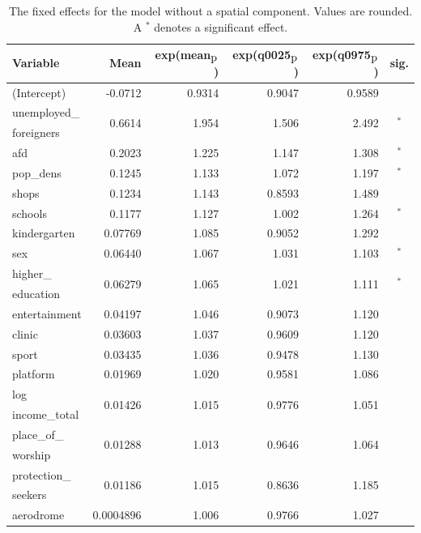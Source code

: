 \begin{table}[H] 
\caption{The fixed effects for the model without a spatial component. Values are rounded. A $^*$ denotes a significant effect.\label{fixedAllGermany}}
\begin{tabular}{l r r r r c}
\toprule
\textbf{Variable}	& \textbf{Mean}	& \textbf{exp(mean$_{\hbox{p}}$)} & \textbf{exp(q0025$_{\hbox{p}}$)} & \textbf{exp(q0975$_{\hbox{p}}$)} & \textbf{sig.}\\
\midrule
(Intercept) & -0.0712 & 0.9314 & 0.9047 & 0.9589 \\
unemployed\_ & \multirow{2}{*}{0.6614} & \multirow{2}{*}{1.954} & \multirow{2}{*}{1.506} & \multirow{2}{*}{2.492} & \multirow{2}{*}{$^*$}\\
foreigners \\
afd & 0.2023  & 1.225 & 1.147 & 1.308 & $^*$\\
pop\_dens & 0.1245 & 1.133 & 1.072 & 1.197 & $^*$\\
shops & 0.1234 & 1.143 & 0.8593 & 1.489 \\
schools & 0.1177 &1.127 & 1.002 & 1.264 & $^*$\\
kindergarten & 0.07769 & 1.085 & 0.9052 & 1.292 \\
sex & 0.06440 &1.067 & 1.031 & 1.103 & $^*$\\
higher\_ & \multirow{2}{*}{0.06279} & \multirow{2}{*}{1.065} & \multirow{2}{*}{1.021} & \multirow{2}{*}{1.111} & \multirow{2}{*}{$^*$} \\
education & \\
entertainment & 0.04197 & 1.046 & 0.9073 & 1.120 \\
clinic & 0.03603&  1.037 & 0.9609 & 1.120 \\
sport & 0.03435& 1.036 & 0.9478 & 1.130 \\
platform & 0.01969 &  1.020 & 0.9581 & 1.086 \\
log & \multirow{2}{*}{0.01426} & \multirow{2}{*}{1.015} & \multirow{2}{*}{0.9776} & \multirow{2}{*}{1.051} \\
income\_total\\
place\_of\_ & \multirow{2}{*}{0.01288} & \multirow{2}{*}{1.013} & \multirow{2}{*}{0.9646} & \multirow{2}{*}{1.064} \\
worship\\
protection\_ & \multirow{2}{*}{0.01186} & \multirow{2}{*}{1.015} & \multirow{2}{*}{0.8636} & \multirow{2}{*}{1.185} \\
seekers\\
aerodrome & 0.0004896 & 1.006 & 0.9766 & 1.027 \\

\end{tabular}
\end{table}
